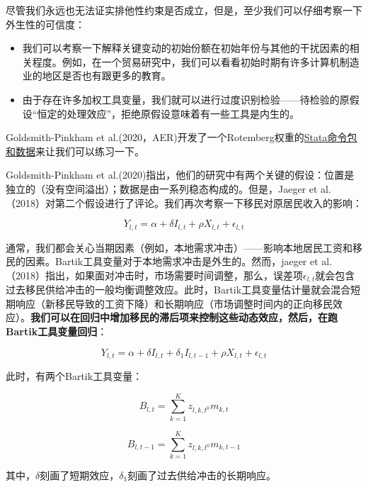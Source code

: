 \documentclass[cn,12pt,math=newtx,citestyle=gb7714-2015,bibstyle=gb7714-2015]{elegantbook}
\begin{document}
	尽管我们永远也无法证实排他性约束是否成立，但是，至少我们可以仔细考察一下外生性的可信度：
	
	\begin{itemize}
		\item 我们可以考察一下解释关键变动的初始份额在初始年份与其他的干扰因素的相关程度。例如，在一个贸易研究中，我们可以看看初始时期有许多计算机制造业的地区是否也有跟更多的教育。
		\item 由于存在许多加权工具变量，我们就可以进行过度识别检验——待检验的原假设“恒定的处理效应”，拒绝原假设意味着有一些工具是内生的。
	\end{itemize}
	
	Goldsmith-Pinkham et al.(2020，AER)开发了一个Rotemberg权重的\href{https://github.com/paulgp/bartik-weight}{Stata命令包和数据}来让我们可以练习一下。
	
	Goldsmith-Pinkham et al.(2020)指出，他们的研究中有两个关键的假设：位置是独立的（没有空间溢出）；数据是由一系列稳态构成的。但是，Jaeger et al.（2018）对第二个假设进行了评论。我们再次考察一下移民对原居民收入的影响：
	
		\begin{equation}
		Y_{l,t} = \alpha + \delta I_{l,t} +\rho X_{l,t} + \epsilon_{l,t}
	\end{equation}

    通常，我们都会关心当期因素（例如，本地需求冲击）——影响本地居民工资和移民的因素。Bartik工具变量对于本地需求冲击是外生的。然而，jaeger et al.（2018）指出，如果面对冲击时，市场需要时间调整，那么，误差项$\epsilon_{l,t}$就会包含过去移民供给冲击的一般均衡调整效应。此时，Bartik工具变量估计量就会混合短期响应（新移民导致的工资下降）和长期响应（市场调整时间内的正向移民效应）。\textbf{我们可以在回归中增加移民的滞后项来控制这些动态效应，然后，在跑Bartik工具变量回归}：
    
    	\begin{equation}
    	Y_{l,t} = \alpha + \delta I_{l,t} + \delta_1 I_{l,t-1} +\rho X_{l,t} + \epsilon_{l,t}
    \end{equation}
	
	此时，有两个Bartik工具变量：
	
		\begin{equation}
		B_{l,t} = \sum_{k=1}^{K} z_{l,k,t^0} m_{k,t}
	\end{equation}

	\begin{equation}
	B_{l,t-1} = \sum_{k=1}^{K} z_{l,k,t^0} m_{k,t-1}
\end{equation}
	
	其中，$\delta$刻画了短期效应，$\delta_1$刻画了过去供给冲击的长期响应。
	
\end{document}
